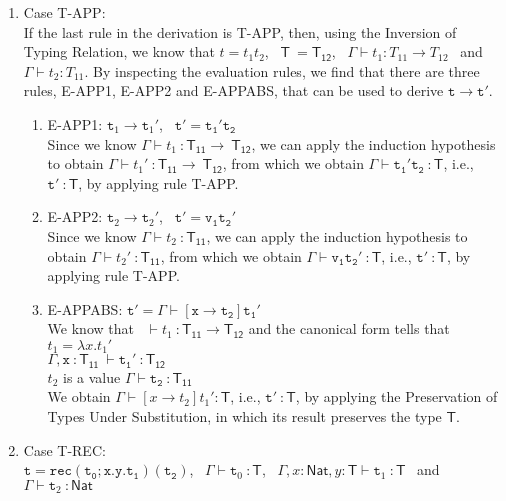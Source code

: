 \documentclass[a4paper]{article}
\begin{document}
\begin{enumerate}
\item Case T-APP:\\
If the last rule in the derivation is T-APP, then, using the Inversion of Typing Relation, we know that $t = t_1 t_2$, \ $\mathsf T~\mathsf {= T_{12}}$, \ $\Gamma\vdash t_1 : T_{11} \rightarrow T_{12}$ \ and \ $\Gamma\vdash t_2 : T_{11}$.
By inspecting the evaluation rules, we find that there are three rules, E-APP1, E-APP2 and E-APPABS, that can be used to derive $\mathtt t \rightarrow \mathtt{t'}$.
\begin{enumerate}
\item E-APP1: $\mathtt t_1 \rightarrow \mathtt t_1'$, \ $\mathtt{t' = t_1' t_2}$
\\Since we know $\Gamma\vdash t_1 ~\mathsf{:T_{11}} \rightarrow ~\mathsf{T_{12}}$, we can apply the induction hypothesis to obtain $\Gamma\vdash t_1' ~\mathsf{:T_{11}} \rightarrow ~\mathsf{T_{12}}$, from which we obtain $\mathtt{\Gamma\vdash t_1' t_2}~\mathsf {:T}$, i.e., $\mathtt{t'}~\mathsf{:T}$, by applying rule T-APP.
\item E-APP2: $\mathtt t_2 \rightarrow \mathtt t_2'$, \ $\mathtt{t' = v_1 t_2'}$
\\Since we know $\Gamma\vdash t_2 ~\mathsf{: T_{11}}$, we can apply the induction hypothesis to obtain $\Gamma\vdash t_2' ~\mathsf{: T_{11}}$, from which we obtain $\mathtt{\Gamma\vdash v_1 t_2'}~\mathsf {:T}$, i.e., $\mathtt{t'}~\mathsf{:T}$, by applying rule T-APP.
\item E-APPABS: $\mathtt{t' = \Gamma\vdash[x \rightarrow t_2] t_1'}$
\\We know that \ $\vdash t_1 ~\mathsf{: T_{11} \rightarrow T_{12}}$ and the canonical form tells that $t_1 = \lambda x.t_1'$ \\ $\mathtt{\Gamma, x}~\mathsf{:T_{11}}\mathtt{\ \vdash t_1'}~\mathsf {:T_{12}}$ \\ $t_2$ is a value $\mathtt{\Gamma\vdash t_2}~\mathsf {:T_{11}}$ \\
We obtain $\Gamma\vdash[x \rightarrow t_2] t_1' \mathsf{:T}$, i.e., $\mathtt{t'}~\mathsf{:T}$, by applying the Preservation of Types Under Substitution, in which its result preserves the type $\mathsf{T}$.
\end{enumerate}
\item Case T-REC:\\
$\mathtt {t = rec(t_0;x.y.t_1)(t_2)}$, \ $\Gamma\vdash \mathtt t_0 ~\mathsf {: T}$, \ $\Gamma, x\mathsf{:Nat}, y\mathsf{:T}\vdash \mathtt t_1 ~\mathsf {: T}$ \ and \ $\Gamma\vdash \mathtt t_2 ~\mathsf {: Nat}$\\

\end{enumerate}
\end{document}
